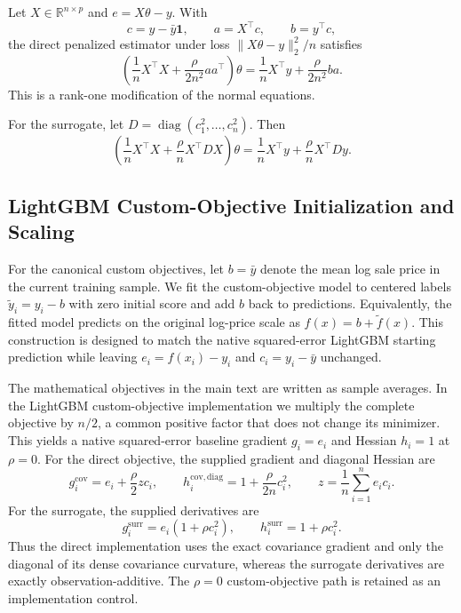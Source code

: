 \documentclass[10pt]{article}
\theoremstyle{definition}
\newcommand{\R}{\mathbb{R}}
\newcommand{\diag}{\operatorname{diag}}
\newcommand{\1}{\mathbf{1}}
\newcommand{\oldtext}[1]{\textcolor{blue}{\sout{#1}}}
\newcommand{\newtext}[1]{\textcolor{impGreen}{#1}}
\begin{document}
Let $X\in\R^{n\times p}$ and $e=X\theta-y$. With
\[
c=y-\bar y\1,\qquad a=X^\top c,\qquad b=y^\top c,
\]
the direct penalized estimator under loss $\|X\theta-y\|_2^2/n$ satisfies
\[
\left(
\frac{1}{n}X^\top X+\frac{\rho}{2n^2}aa^\top
\right)\theta
=
\frac{1}{n}X^\top y+\frac{\rho}{2n^2}ba.
\]
This is a rank-one modification of the normal equations.

For the surrogate, let $D=\diag(c_1^2,\ldots,c_n^2)$. Then
\[
\left(
\frac{1}{n}X^\top X+\frac{\rho}{n}X^\top DX
\right)\theta
=
\frac{1}{n}X^\top y+\frac{\rho}{n}X^\top Dy.
\]

\subsection{LightGBM Custom-Objective Initialization and Scaling}

For the canonical custom objectives, let $b=\bar y$ denote the mean log sale price
in the current training sample. We fit the custom-objective model to centered labels
$\widetilde y_i=y_i-b$ with zero initial score and add $b$ back to predictions.
Equivalently, the fitted model predicts on the original log-price scale as
$f(x)=b+\widetilde f(x)$. 
\newtext{This construction is designed to match the native squared-error LightGBM starting prediction while leaving $e_i=f(x_i)-y_i$ and $c_i=y_i-\bar y$ unchanged.}

The mathematical objectives in the main text are written as sample averages. In
the LightGBM custom-objective implementation we multiply the complete objective by
$n/2$, a common positive factor that does not change its minimizer. This yields a
native squared-error baseline gradient $g_i=e_i$ and Hessian $h_i=1$ at $\rho=0$.
For the direct objective, the supplied gradient and diagonal Hessian are
\[
g_i^{\mathrm{cov}}
=
e_i+\frac{\rho}{2}z c_i,
\qquad
h_i^{\mathrm{cov,diag}}
=
1+\frac{\rho}{2n}c_i^2,
\qquad
z=\frac{1}{n}\sum_{i=1}^n e_i c_i.
\]
For the surrogate, the supplied derivatives are
\[
g_i^{\mathrm{surr}}=e_i(1+\rho c_i^2),
\qquad
h_i^{\mathrm{surr}}=1+\rho c_i^2.
\]
Thus the direct implementation uses the exact covariance gradient and only the
diagonal of its dense covariance curvature, whereas the surrogate derivatives are
exactly observation-additive. The $\rho=0$ custom-objective path is retained as an
implementation control.
\end{document}
